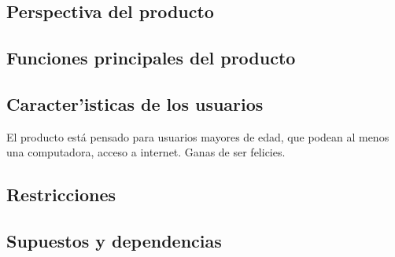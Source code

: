  \subsection{ Perspectiva del producto	}

 \subsection{ Funciones principales del producto 	}


 \subsection{ Caracter'isticas de los usuarios	}
El producto está pensado para usuarios mayores de edad, que podean al menos una computadora, acceso a internet.
Ganas de ser felicies.

 \subsection{ Restricciones	}

 \subsection{ Supuestos y dependencias	}

